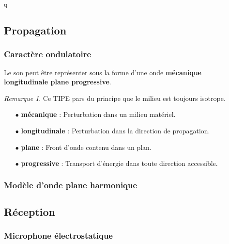 q\documentclass[a4paper]{report}
\theoremstyle{remark}
\newtheorem{remark}{Remarque}
\begin{document}
\subsection{Propagation}
\subsubsection{Caractère ondulatoire}
Le son peut être représenter sous la forme d'une onde\textbf{ {\color{bleu}mécanique}  {\color{violet}longitudinale} {\color{cyan}plane} {\color{vert}progressive}}.
\begin{remark}
	Ce TIPE pars du principe que le milieu est toujours isotrope.
\end{remark}


\begin{itemize}
\item[$\bullet$] 	\textbf{\color{bleu}mécanique} : Perturbation dans un milieu matériel.
\item[$\bullet$] 	\textbf{\color{violet}longitudinale} : Perturbation dans la direction de propagation.
\item[$\bullet$] 	\textbf{\color{cyan}plane} : Front d'onde contenu dans un plan.
\item[$\bullet$] 	\textbf{\color{vert}progressive} : Transport d'énergie dans toute direction accessible.
\end{itemize}

\subsubsection{Modèle d'onde plane harmonique}

\subsection{Réception}
\subsubsection{Microphone électrostatique}

\newpage
\end{document}
